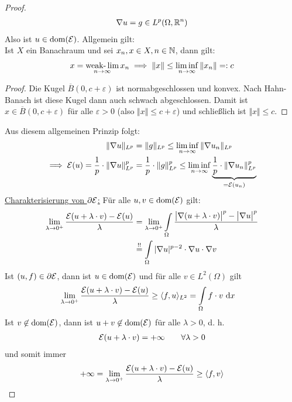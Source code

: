 \begin{beispiel}
\begin{proof}
\begin{align*}
\nabla u=g\in L^p(\Omega,\mathbb{R}^n)
\end{align*}
Also ist $u\in\text{dom}(\mathcal{E})$. Allgemein gilt:\\
Ist $X$ ein Banachraum und sei $x_n,x\in X,n\in\mathbb{N}$, dann gilt:
\begin{align*}
x=\operatorname*{\text{weak-}\lim}\limits_{n\to\infty} x_n\implies\Vert x\Vert\leq\liminf\limits_{n\to\infty}\Vert x_n\Vert=:c
\end{align*}
\begin{proof}
Die Kugel $\overline{B}(0,c+\varepsilon)$ ist normabgeschlossen und konvex. Nach Hahn-Banach ist diese Kugel dann auch schwach abgeschlossen.
Damit ist $x\in\overline{B}(0,c+\varepsilon)$ für alle $\varepsilon>0$ (also $\Vert x\Vert\leq c+\varepsilon$) und schließlich ist $\Vert x\Vert\leq c$.
\end{proof}
Aus diesem allgemeinen Prinzip folgt:
\begin{align*}
\Vert\nabla u\Vert_{L^p}&=\Vert g\Vert_{L^p}\leq\liminf\limits_{n\to\infty}\Vert \nabla u_n\Vert_{L^p}\\
\implies
\mathcal{E}(u)=\frac{1}{p}\cdot\Vert\nabla u\Vert_{L^p}^p&=\frac{1}{p}\cdot\Vert g\Vert_{L^p}^p\leq\liminf\limits_{n\to\infty}\underbrace{\frac{1}{p}\cdot\Vert \nabla u_n\Vert_{L^p}^p}_{=\mathcal{E}(u_n)}
\end{align*}
\underline{Charakterisierung von $\partial\mathcal{E}$:} 
Für alle $u,v\in\text{dom}(\mathcal{E})$ gilt:
\begin{align*}
\lim\limits_{\lambda\to 0^+}\frac{\mathcal{E}(u+\lambda\cdot v)-\mathcal{E}(u)}{\lambda}&=\lim\limits_{\lambda\to 0^+}\int\limits_\Omega\frac{\big|\nabla(u+\lambda\cdot v)\big|^p-\big|\nabla u\big|^p}{\lambda}\\
&\stackrel{!!}{=}
\int\limits_\Omega|\nabla u|^{p-2}\cdot\nabla u\cdot\nabla v
\end{align*}
Ist $(u,f)\in\partial\mathcal{E}$, dann ist $u\in\text{dom}(\mathcal{E})$ und für alle $v\in L^2(\Omega)$ gilt
\begin{align*}
\lim\limits_{\lambda\to 0^+}\frac{\mathcal{E}(u+\lambda\cdot v)-\mathcal{E}(u)}{\lambda}&\geq\langle f,u\rangle_{L^2}
=\int\limits_\Omega f\cdot v\text{ d} x
\end{align*}
Ist $v\not\in\text{dom}(\mathcal{E})$, dann ist $u+v\not\in\text{dom}(\mathcal{E})$ für alle $\lambda>0$, d. h.
\begin{align*}
\mathcal{E}(u+\lambda\cdot v)=+\infty\qquad\forall\lambda>0
\end{align*}
und somit immer
\begin{align*}
+\infty=\lim\limits_{\lambda\to 0^+}\frac{\mathcal{E}(u+\lambda\cdot v)-\mathcal{E}(u)}{\lambda}\geq\langle f,v\rangle
\end{align*}

\end{proof}
\end{beispiel}
